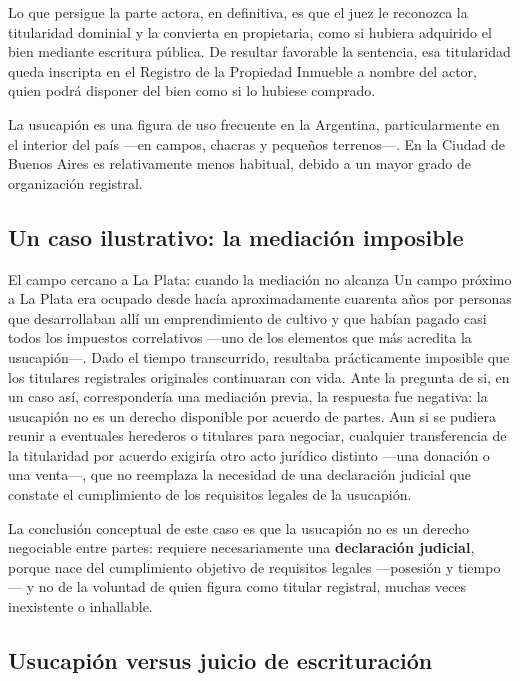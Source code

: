 \documentclass[12pt,oneside]{book}
\begin{document}
Lo que persigue la parte actora, en definitiva, es que el juez le reconozca la titularidad dominial y la convierta en propietaria, como si hubiera adquirido el bien mediante escritura pública. De resultar favorable la sentencia, esa titularidad queda inscripta en el Registro de la Propiedad Inmueble a nombre del actor, quien podrá disponer del bien como si lo hubiese comprado.

\begin{note}
La usucapión es una figura de uso frecuente en la Argentina, particularmente en el interior del país —en campos, chacras y pequeños terrenos—. En la Ciudad de Buenos Aires es relativamente menos habitual, debido a un mayor grado de organización registral.
\end{note}

\subsection{Un caso ilustrativo: la mediación imposible}

\begin{example}{El campo cercano a La Plata: cuando la mediación no alcanza}
Un campo próximo a La Plata era ocupado desde hacía aproximadamente cuarenta años por personas que desarrollaban allí un emprendimiento de cultivo y que habían pagado casi todos los impuestos correlativos —uno de los elementos que más acredita la usucapión—. Dado el tiempo transcurrido, resultaba prácticamente imposible que los titulares registrales originales continuaran con vida. Ante la pregunta de si, en un caso así, correspondería una mediación previa, la respuesta fue negativa: la usucapión no es un derecho disponible por acuerdo de partes. Aun si se pudiera reunir a eventuales herederos o titulares para negociar, cualquier transferencia de la titularidad por acuerdo exigiría otro acto jurídico distinto —una donación o una venta—, que no reemplaza la necesidad de una declaración judicial que constate el cumplimiento de los requisitos legales de la usucapión.
\end{example}

La conclusión conceptual de este caso es que la usucapión no es un derecho negociable entre partes: requiere necesariamente una \textbf{declaración judicial}, porque nace del cumplimiento objetivo de requisitos legales —posesión y tiempo— y no de la voluntad de quien figura como titular registral, muchas veces inexistente o inhallable.

\subsection{Usucapión versus juicio de escrituración}
\end{document}
